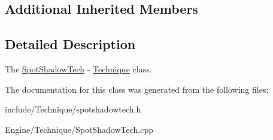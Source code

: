 \subsection*{Additional Inherited Members}


\subsection{Detailed Description}
The \hyperlink{classEngine_1_1SpotShadowTech}{Spot\+Shadow\+Tech} -\/ \hyperlink{classEngine_1_1Technique}{Technique} class. 

The documentation for this class was generated from the following files\+:\begin{DoxyCompactItemize}
\item 
include/\+Technique/spotshadowtech.\+h\item 
Engine/\+Technique/Spot\+Shadow\+Tech.\+cpp\end{DoxyCompactItemize}
